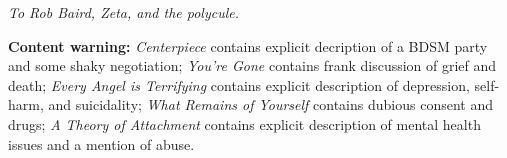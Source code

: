 \null

\vfill

\begin{flushright}
    \emph{To Rob Baird, Zeta, and the polycule.}
\end{flushright}

\vfill

\noindent \textbf{Content warning:} \emph{Centerpiece} contains explicit decription of a BDSM party and some shaky negotiation; \emph{You're Gone} contains frank discussion of grief and death; \emph{Every Angel is Terrifying} contains explicit description of depression, self-harm, and suicidality; \emph{What Remains of Yourself} contains dubious consent and drugs; \emph{A Theory of Attachment} contains explicit description of mental health issues and a mention of abuse.
